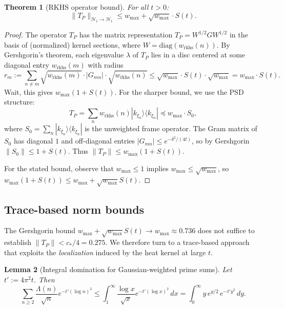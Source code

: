 \documentclass[11pt,a4paper]{article}
\newtheorem{theorem}{Theorem}[section]
\newtheorem{lemma}[theorem]{Lemma}
\theoremstyle{definition}
\theoremstyle{remark}
\begin{document}
\begin{theorem}[RKHS operator bound]\label{thm:rkhs-bound}
For all $t > 0$:
\begin{equation}\label{eq:rkhs-bound}
  \|T_P\|_{\mathcal{H}_t \to \mathcal{H}_t} \leq w_{\max} + \sqrt{w_{\max}} \cdot S(t).
\end{equation}
\end{theorem}

\begin{proof}
The operator $T_P$ has the matrix representation $T_P = W^{1/2} G W^{1/2}$ in the basis of (normalized) kernel sections, where $W = \mathrm{diag}(w_{\mathrm{rkhs}}(n))$. By Gershgorin's theorem, each eigenvalue $\lambda$ of $T_P$ lies in a disc centered at some diagonal entry $w_{\mathrm{rkhs}}(m)$ with radius
\[
  r_m := \sum_{n \neq m} \sqrt{w_{\mathrm{rkhs}}(m)} \cdot |G_{mn}| \cdot \sqrt{w_{\mathrm{rkhs}}(n)}
       \leq \sqrt{w_{\max}} \cdot S(t) \cdot \sqrt{w_{\max}} = w_{\max} \cdot S(t).
\]
Wait, this gives $w_{\max}(1 + S(t))$. For the sharper bound, we use the PSD structure:
\[
  T_P = \sum_n w_{\mathrm{rkhs}}(n) |k_{\xi_n}\rangle \langle k_{\xi_n}| \preceq w_{\max} \cdot S_0,
\]
where $S_0 = \sum_n |k_{\xi_n}\rangle \langle k_{\xi_n}|$ is the unweighted frame operator. The Gram matrix of $S_0$ has diagonal $1$ and off-diagonal entries $|G_{mn}| \leq e^{-\delta^2/(4t)}$, so by Gershgorin $\|S_0\| \leq 1 + S(t)$. Thus $\|T_P\| \leq w_{\max}(1 + S(t))$.

For the stated bound, observe that $w_{\max} \leq 1$ implies $w_{\max} \leq \sqrt{w_{\max}}$, so $w_{\max}(1 + S(t)) \leq w_{\max} + \sqrt{w_{\max}} S(t)$.
\end{proof}

\subsection{Trace-based norm bounds}

The Gershgorin bound $w_{\max} + \sqrt{w_{\max}} S(t) \to w_{\max} \approx 0.736$ does not suffice to establish $\|T_P\| < c_*/4 = 0.275$. We therefore turn to a trace-based approach that exploits the \emph{localization} induced by the heat kernel at large $t$.

\begin{lemma}[Integral domination for Gaussian-weighted prime sums]\label{lem:sum-to-integral}
Let $t' := 4\pi^2 t$. Then
\begin{equation}\label{eq:sum-integral}
  \sum_{n \geq 2} \frac{\Lambda(n)}{\sqrt{n}} e^{-t'(\log n)^2}
  \leq \int_1^{\infty} \frac{\log x}{\sqrt{x}} e^{-t'(\log x)^2}\, dx
  = \int_0^{\infty} y \, e^{y/2} \, e^{-t' y^2}\, dy.
\end{equation}
\end{lemma}
\end{document}
